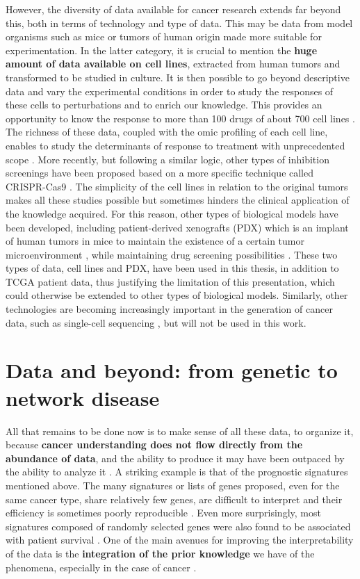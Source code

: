 \documentclass[a4paper,12pt,twoside,onecolumn,openright,final,oldfontcommands]{memoir}
\begin{document}
However, the diversity of data available for cancer research extends far
beyond this, both in terms of technology and type of data. This may be
data from model organisms such as mice or tumors of human origin made
more suitable for experimentation. In the latter category, it is crucial
to mention the \textbf{huge amount of data available on cell lines},
extracted from human tumors and transformed to be studied in culture. It
is then possible to go beyond descriptive data and vary the experimental
conditions in order to study the responses of these cells to
perturbations and to enrich our knowledge. This provides an opportunity
to know the response to more than 100 drugs of about 700 cell lines
\citep{yang2012genomics}. The richness of these data, coupled with the
omic profiling of each cell line, enables to study the determinants of
response to treatment with unprecedented scope
\citep{iorio2016landscape}. More recently, but following a similar
logic, other types of inhibition screenings have been proposed based on
a more specific technique called CRISPR-Cas9
\citep{behan2019prioritization}. The simplicity of the cell lines in
relation to the original tumors makes all these studies possible but
sometimes hinders the clinical application of the knowledge acquired.
For this reason, other types of biological models have been developed,
including patient-derived xenografts (PDX) which is an implant of human
tumors in mice to maintain the existence of a certain tumor
microenvironment \citep{hidalgo2014patient}, while maintaining drug
screening possibilities \citep{gao2015high}. These two types of data,
cell lines and PDX, have been used in this thesis, in addition to TCGA
patient data, thus justifying the limitation of this presentation, which
could otherwise be extended to other types of biological models.
Similarly, other technologies are becoming increasingly important in the
generation of cancer data, such as single-cell sequencing
\citep{navin2015first}, but will not be used in this work.

\section{Data and beyond: from genetic to network
disease}\label{data-and-beyond-from-genetic-to-network-disease}

All that remains to be done now is to make sense of all these data, to
organize it, because \textbf{cancer understanding does not flow directly
from the abundance of data}, and the ability to produce it may have been
outpaced by the ability to analyze it \citep{stadler2014cancer}. A
striking example is that of the prognostic signatures mentioned above.
The many signatures or lists of genes proposed, even for the same cancer
type, share relatively few genes, are difficult to interpret and their
efficiency is sometimes poorly reproducible \citep{domany2014using}.
Even more surprisingly, most signatures composed of randomly selected
genes were also found to be associated with patient survival
\citep{venet2011most}. One of the main avenues for improving the
interpretability of the data is the \textbf{integration of the prior
knowledge} we have of the phenomena, especially in the case of cancer
\citep{domany2014using}.
\end{document}

